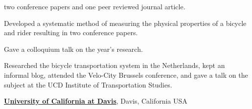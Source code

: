 \documentclass[10pt]{article}
\newenvironment{outerlist}[1][\enskip\textbullet]%
        {\begin{itemize}[#1]}{\end{itemize}%
         \vspace{-.6\baselineskip}}
\newenvironment{innerlist}[1][\enskip\textbullet]%
        {\begin{compactitem}[#1]}{\end{compactitem}}
\newcommand{\blankline}{\quad\pagebreak[2]}
\begin{document}
\begin{outerlist}
\begin{innerlist}
        two conference papers and one peer reviewed journal article.
    \item Developed a systematic method of measuring the physical properties of
        a bicycle and rider resulting in two conference papers.
    \item Gave a colloquium talk on the year's research.
    \item Researched the bicycle transportation system in the Netherlands, kept
        an informal blog, attended the Velo-City Brussels conference, and gave
        a talk on the subject at the UCD Institute of Transportation Studies.
  \end{innerlist}
\end{outerlist}


\blankline

\href{http://www.ucdavis.edu}{\textbf{University of California at Davis}}, Davis, California USA
\end{document}
